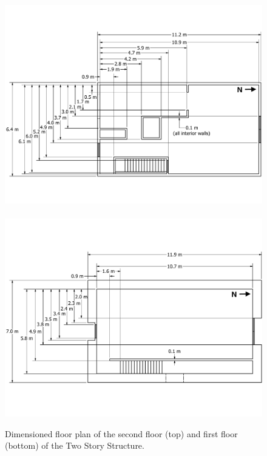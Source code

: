 \documentclass[12pt,oneside]{book}
\begin{document}
\begin{figure}[!ht]
	\includegraphics[width=\columnwidth]{../Figures/Floor_Plans/West_Structure_2nd_Floor_Dimensioned_Full}
	\\~\\
	\includegraphics[width=\columnwidth]{../Figures/Floor_Plans/West_Structure_1st_Floor_Dimensioned_Full}
	\caption[Dimensioned floor plan of the first and second floors of the Two Story Structure.]{Dimensioned floor plan of the second floor (top) and first floor (bottom) of the Two Story Structure.}
	\label{fig:west_dimensioned_plan}
\end{figure}

\clearpage
\end{document}
